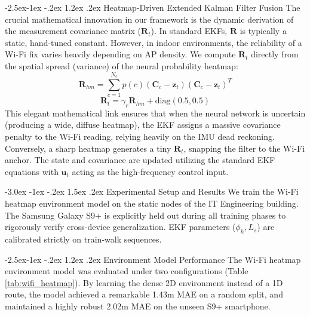 \documentclass[journal,twoside,compsoc]{IEEEtran}
\makeatletter
\renewcommand{\section}{\@startsection{section}{1}{\z@}%
                       {-3.0ex \@plus -1ex \@minus -.2ex}%
                       {1.5ex \@plus.2ex}%
                       {\normalfont\large\bfseries\sffamily\color{accessblue}}}
\renewcommand{\subsection}{\@startsection{subsection}{2}{\z@}%
                       {-2.5ex\@plus -1ex \@minus -.2ex}%
                       {1.2ex \@plus .2ex}%
                       {\normalfont\normalsize\bfseries\sffamily\color{accessblue}}}
\makeatother
\begin{document}
\subsection{Heatmap-Driven Extended Kalman Filter Fusion}
The crucial mathematical innovation in our framework is the dynamic derivation of the measurement covariance matrix ($\mathbf{R}_t$). In standard EKFs, $\mathbf{R}$ is typically a static, hand-tuned constant. However, in indoor environments, the reliability of a Wi-Fi fix varies heavily depending on AP density. We compute $\mathbf{R}_t$ directly from the spatial spread (variance) of the neural probability heatmap:
\begin{equation}
\mathbf{R}_{hm} = \sum_{c=1}^{N_c} p(c) (\mathbf{C}_c - \mathbf{z}_t)(\mathbf{C}_c - \mathbf{z}_t)^T
\end{equation}
\begin{equation}
\mathbf{R}_t = \gamma_r \mathbf{R}_{hm} + \text{diag}(0.5, 0.5)
\end{equation}
This elegant mathematical link ensures that when the neural network is uncertain (producing a wide, diffuse heatmap), the EKF assigns a massive covariance penalty to the Wi-Fi reading, relying heavily on the IMU dead reckoning. Conversely, a sharp heatmap generates a tiny $\mathbf{R}_t$, snapping the filter to the Wi-Fi anchor. The state and covariance are updated utilizing the standard EKF equations with $\mathbf{u}_t$ acting as the high-frequency control input.

\section{Experimental Setup and Results}
We train the Wi-Fi heatmap environment model on the static nodes of the IT Engineering building. The Samsung Galaxy S9+ is explicitly held out during all training phases to rigorously verify cross-device generalization. EKF parameters ($\phi_h, L_s$) are calibrated strictly on train-walk sequences.

\subsection{Environment Model Performance}
The Wi-Fi heatmap environment model was evaluated under two configurations (Table \ref{tab:wifi_heatmap}). By learning the dense 2D environment instead of a 1D route, the model achieved a remarkable 1.43m MAE on a random split, and maintained a highly robust 2.02m MAE on the unseen S9+ smartphone.
\end{document}

